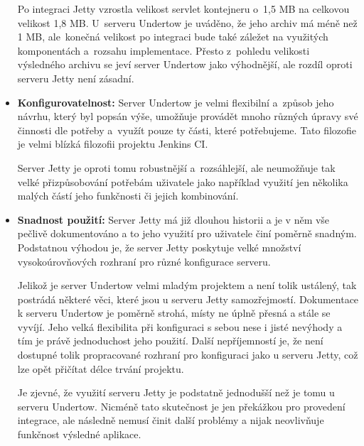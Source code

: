 \begin{itemize}
{                    Po integraci Jetty vzrostla velikost servlet kontejneru o~1,5 MB na celkovou
                    velikost 1,8 MB. U~serveru Undertow je uváděno, že jeho archiv má méně
                    než 1 MB, ale~konečná velikost po integraci bude také záležet na využitých komponentách
                    a~rozsahu implementace. Přesto z~pohledu velikosti výsledného archivu
                    se jeví server Undertow jako výhodnější, ale rozdíl oproti serveru Jetty není zásadní.}

                \item{\textbf{Konfigurovatelnost:} Server Undertow je velmi flexibilní a~způsob
                    jeho návrhu, který byl popsán výše, umožňuje provádět mnoho různých úpravy 
                    své činnosti dle potřeby a~využít pouze ty části, které potřebujeme.
                    Tato filozofie je velmi blízká filozofii projektu Jenkins CI. 
                    
                    Server Jetty
                    je oproti tomu robustnější a~rozsáhlejší, ale neumožňuje tak velké přizpůsobování potřebám
                    uživatele jako například využití jen několika malých částí jeho funkčnosti či jejich
                    kombinování. }


                \item{\textbf{Snadnost použití:}}                      
                    Server Jetty má již dlouhou historii a je v něm vše pečlivě dokumentováno
                    a to jeho využití pro uživatele činí poměrně snadným. Podstatnou výhodou je, že
                    server Jetty poskytuje velké množství vysokoúrovňových rozhraní
                    pro různé konfigurace serveru.
                    
                    Jelikož je server Undertow velmi mladým projektem a není tolik ustálený, 
                    tak postrádá některé věci,
                    které jsou u serveru Jetty samozřejmostí. 
                    Dokumentace k serveru
                    Undertow je poměrně strohá, místy ne úplně přesná a stále se vyvíjí. 
                    Jeho velká flexibilita při konfiguraci s sebou nese i jisté nevýhody
                    a tím je právě jednoduchost jeho použití. Další nepříjemností je, že není
                    dostupné tolik propracované rozhraní pro konfiguraci jako u serveru Jetty,
                    což lze opět přičítat délce trvání projektu.

                    Je zjevné, že využití serveru Jetty je podstatně jednodušší než je tomu
                    u serveru Undertow. Nicméně tato skutečnost je jen překážkou pro provedení
                    integrace, ale následně nemusí činit další problémy a nijak neovlivňuje
                    funkčnost výsledné aplikace.

            \end{itemize}
        

